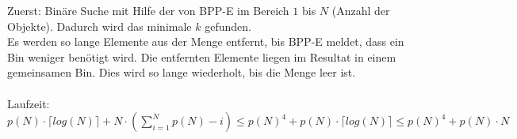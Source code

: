 Zuerst: Binäre Suche mit Hilfe der von BPP-E im Bereich $1$ bis $N$ (Anzahl der Objekte). Dadurch wird das minimale $k$ gefunden.\\
Es werden so lange Elemente aus der Menge entfernt, bis BPP-E meldet, dass ein Bin weniger benötigt wird. Die entfernten Elemente liegen im Resultat in einem gemeinsamen Bin. Dies wird so lange wiederholt, bis die Menge leer ist.\\ \ \\
Laufzeit: $p(N) \cdot \lceil log(N) \rceil + N \cdot (\sum_{i=1}^N p(N)-i) \leq p(N)^4 + p(N)\cdot \lceil log(N) \rceil \leq p(N)^4 + p(N)\cdot N$\\


